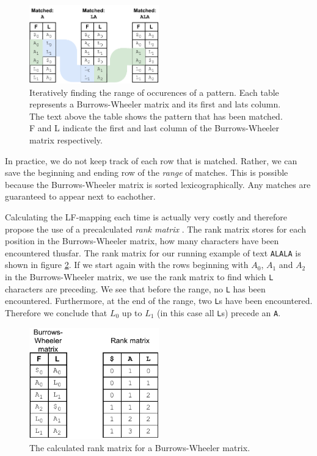 \begin{figure}[ht]
\centering
\includegraphics[width=0.5\textwidth]{figures/bw_occurences.pdf}
\caption{Iteratively finding the range of occurences of a pattern. Each table represents a Burrows-Wheeler matrix and its first and lats column. The text above the table shows the pattern that has been matched. F and L indicate the first and last column of the Burrows-Wheeler matrix respectively.}
\label{fig:bw_occurences}
\end{figure}

In practice, we do not keep track of each row that is matched.
Rather, we can save the beginning and ending row of the \textit{range} of matches.
This is possible because the Burrows-Wheeler matrix is sorted lexicographically.
Any matches are guaranteed to appear next to eachother.

Calculating the LF-mapping each time is actually very costly and therefore \citeauthor{ferragina_opportunistic_2000} propose the use of a precalculated \textit{rank matrix} \cite{ferragina_opportunistic_2000,langmead_ultrafast_2009}.
The rank matrix stores for each position in the Burrows-Wheeler matrix, how many characters have been encountered thusfar.
The rank matrix for our running example of text \texttt{ALALA} is shown in figure \ref{fig:bw_rank_matrix}.
If we start again with the rows beginning with $A_0$, $A_1$ and $A_2$ in the Burrows-Wheeler matrix, we use the rank matrix to find which \texttt{L} characters are preceding.
We see that before the range, no \texttt{L} has been encountered.
Furthermore, at the end of the range, two \texttt{L}s have been encountered.
Therefore we conclude that $L_0$ up to $L_1$ (in this case all \texttt{L}s) precede an \texttt{A}.

\begin{figure}[ht]
\centering
\includegraphics[width=0.5\textwidth]{figures/bw_rank_matrix.pdf}
\caption{The calculated rank matrix for a Burrows-Wheeler matrix.}
\label{fig:bw_rank_matrix}
\end{figure}

